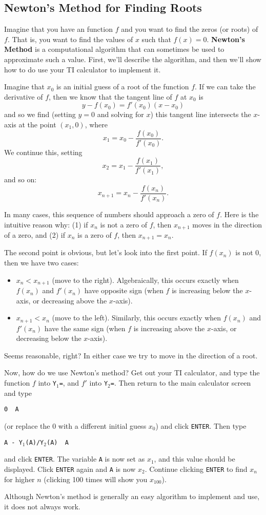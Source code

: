 \subsection{Newton's Method for Finding Roots}

Imagine that you have an function $f$ and you want to find the zeros (or roots) of $f$. That is, you want to find the values of $x$ such that $f(x)=0$. \textbf{Newton's Method} is a computational algorithm that can sometimes be used to approximate such a value. First, we'll describe the algorithm, and then we'll show how to do use your TI calculator to implement it.

Imagine that $x_0$ is an initial guess of a root of the function $f$. If we can take the derivative of $f$, then we know that the tangent line of $f$ at $x_0$ is
$$y-f(x_0)=f'(x_0)(x-x_0)$$
and so we find (setting $y=0$ and solving for $x$) this tangent line intersects the $x$-axis at the point $(x_1,0)$, where
$$x_1=x_0-\frac{f(x_0)}{f'(x_0)}.$$
We continue this, setting
$$x_2=x_1-\frac{f(x_1)}{f'(x_1)},$$
and so on:
$$x_{n+1}=x_n-\frac{f(x_n)}{f'(x_n)}.$$

In many cases, this sequence of numbers should approach a zero of $f$. Here is the intuitive reason why: (1) if $x_n$ is not a zero of $f$, then $x_{n+1}$ moves in the direction of a zero, and (2) if $x_n$ is a zero of $f$, then $x_{n+1}=x_n$.

The second point is obvious, but let's look into the first point. If $f(x_n)$ is not 0, then we have two cases:
\begin{itemize}
\item $x_n<x_{n+1}$ (move to the right).  Algebraically, this occurs exactly when $f(x_n)$ and $f'(x_n)$ have opposite sign (when $f$ is increasing below the $x$-axis, or decreasing above the $x$-axis).
\item $x_{n+1}<x_n$ (move to the left). Similarly, this occurs exactly when $f(x_n)$ and $f'(x_n)$ have the same sign (when $f$ is increasing above the $x$-axis, or decreasing below the $x$-axis).
\end{itemize}
Seems reasonable, right? In either case we try to move in the direction of  a root.

Now, how do we use Newton's method? Get out your TI calculator, and type the function $f$ into \texttt{Y$_\text{1}$=}, and $f'$ into \texttt{Y$_\text{2}$=}. Then return to the main calculator screen and type
\begin{center}
\texttt{0 \MVRightarrow \ A}
\end{center}
(or replace the 0 with a different initial guess $x_0$) and click \texttt{ENTER}. Then type
\begin{center}
\texttt{A - Y$_\text{1}$(A)/Y$_\text{2}$(A) \MVRightarrow \ A}
\end{center}
and click \texttt{ENTER}. The variable \texttt{A} is now set as $x_1$, and this value should be displayed. Click \texttt{ENTER} again and \texttt{A} is now $x_2$. Continue clicking \texttt{ENTER} to find $x_n$ for higher $n$ (clicking 100 times will show you $x_{100}$).

Although Newton's method is generally an easy algorithm to implement and use, it does not always work.


